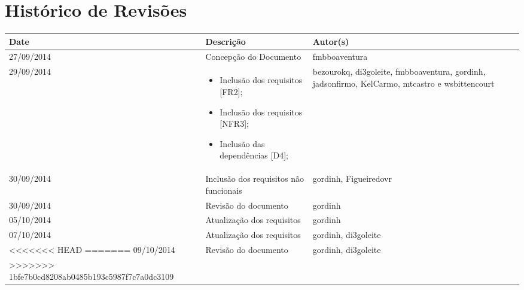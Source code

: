 \documentclass{article}
\begin{document}

\capa
\newpage

\section*{\center Histórico de Revisões}
  \vspace*{1cm}
  \begin{table}[ht]
    \centering
    \begin{tabular}[pos]{|m{2cm} | m{7.2cm} | m{3.8cm}|}
      \hline
      \cellcolor[gray]{0.9}
      \textbf{Date} & \cellcolor[gray]{0.9}\textbf{Descrição} & \cellcolor[gray]{0.9}\textbf{Autor(s)}\\ \hline
      \hline
      \small 27/09/2014 & \small Concepção do Documento & \small fmbboaventura \\ \hline
      \small 29/09/2014 &
      \begin{small}
        \begin{itemize}
          \item Inclusão dos requisitos [FR2];
          \item Inclusão dos requisitos [NFR3];
          \item Inclusão das dependências [D4];
        \end{itemize}
      \end{small} & \small bezourokq, di3goleite, fmbboaventura, gordinh, jadsonfirmo, KelCarmo, mtcastro e wsbittencourt \\ \hline
      \small 30/09/2014 & \small Inclusão dos requisitos não funcionais & \small gordinh, Figueiredovr \\ \hline
      \small 30/09/2014 & \small Revisão do documento & \small gordinh \\ \hline
      \small 05/10/2014 & \small Atualização dos requisitos & \small gordinh \\ \hline
      \small 07/10/2014 & \small Atualização dos requisitos & \small gordinh, di3goleite \\ \hline
<<<<<<< HEAD
=======
      \small 09/10/2014 & \small Revisão do documento & \small gordinh, di3goleite \\ \hline
>>>>>>> 1bfe7b0cd8208ab0485b193c5987f7c7a0dc3109
    \end{tabular}
  \end{table}
\end{document}
